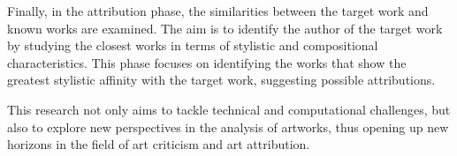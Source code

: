 \noindent Finally, in the attribution phase, the similarities between the target work and known works are examined. The aim is to identify the author of the target work by studying the closest works in terms of stylistic and compositional characteristics. This phase focuses on identifying the works that show the greatest stylistic affinity with the target work, suggesting possible attributions.

\noindent This research not only aims to tackle technical and computational challenges, but also to explore new perspectives in the analysis of artworks, thus opening up new horizons in the field of art criticism and art attribution.









%
